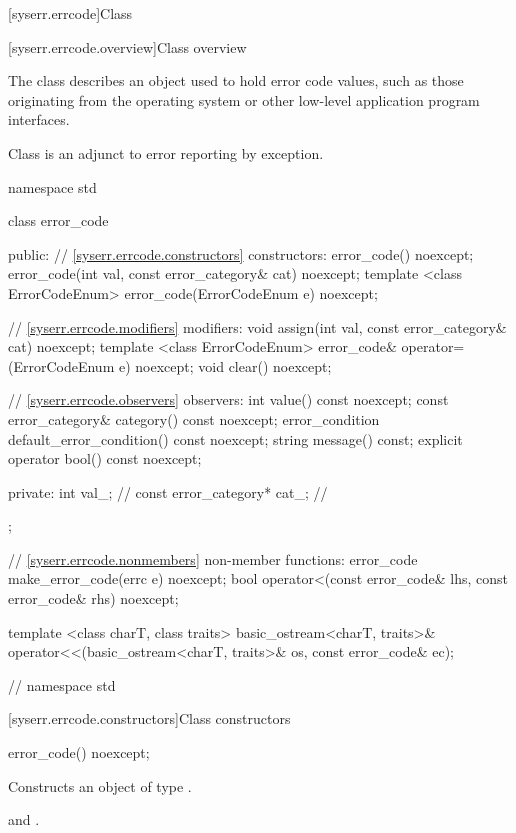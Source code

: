 [syserr.errcode]{Class }

[syserr.errcode.overview]{Class  overview}

\pnum
The class  describes an object used to hold error code
values, such as those originating from the operating system or other low-level
application program interfaces. \begin{note} Class  is an
adjunct to error reporting by exception. \end{note}

%
\begin{codeblock}
namespace std {
  class error_code {
  public:
    // \ref{syserr.errcode.constructors} constructors:
    error_code() noexcept;
    error_code(int val, const error_category& cat) noexcept;
    template <class ErrorCodeEnum>
      error_code(ErrorCodeEnum e) noexcept;

    // \ref{syserr.errcode.modifiers} modifiers:
    void assign(int val, const error_category& cat) noexcept;
    template <class ErrorCodeEnum>
        error_code& operator=(ErrorCodeEnum e) noexcept;
    void clear() noexcept;

    // \ref{syserr.errcode.observers} observers:
    int value() const noexcept;
    const error_category& category() const noexcept;
    error_condition default_error_condition() const noexcept;
    string message() const;
    explicit operator bool() const noexcept;

  private:
    int val_;                   // \expos
    const error_category* cat_; // \expos
  };

  // \ref{syserr.errcode.nonmembers} non-member functions:
  error_code make_error_code(errc e) noexcept;
  bool operator<(const error_code& lhs, const error_code& rhs) noexcept;

  template <class charT, class traits>
    basic_ostream<charT, traits>&
      operator<<(basic_ostream<charT, traits>& os, const error_code& ec);
}   // namespace std
\end{codeblock}

[syserr.errcode.constructors]{Class  constructors}

%
\begin{itemdecl}
error_code() noexcept;
\end{itemdecl}

\begin{itemdescr}
\pnum
\effects Constructs an object of type .

\pnum
\postconditions {} and .
\end{itemdescr}

